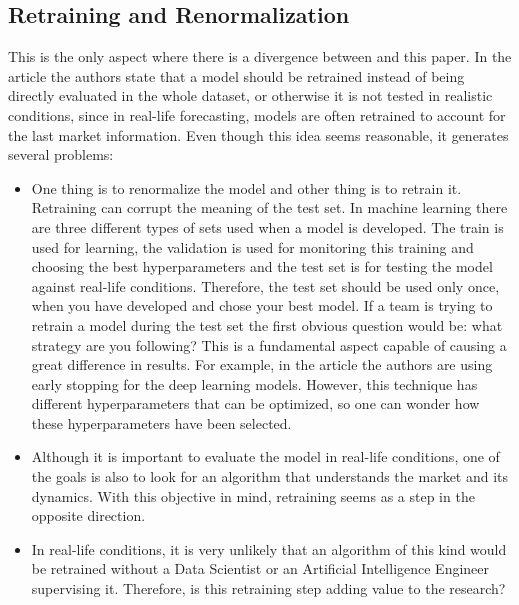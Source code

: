 \documentclass[journal]{IEEEtran}
\begin{document}
\subsection{Retraining and Renormalization}

This is the only aspect where there is a divergence between \cite{lagoForecastingDayaheadElectricity2021} and this paper. In the article the authors state that a model should be retrained instead of being directly evaluated in the whole dataset, or otherwise it is not tested in realistic conditions, since in  real-life forecasting, models are often retrained to account for the last market information. Even though this idea seems reasonable, it generates several problems:

\begin{itemize}
    \item One thing is to renormalize the model and other thing is to retrain it. Retraining can corrupt the meaning of the test set. In machine learning there are three different types of sets used when a model is developed. The train is used for learning, the validation is used for monitoring this training and choosing the best hyperparameters and the test set is for testing the model against real-life conditions. Therefore, the test set should be used only once, when you have developed and chose your best model. If a team is trying to retrain a model during the test set the first obvious question would be: what strategy are you following? This is a fundamental aspect capable of causing a great difference in results. For example, in the article the authors are using early stopping for the deep learning models. However, this technique has different hyperparameters that can be optimized, so one can wonder how these hyperparameters have been selected.
    \item Although it is important to evaluate the model in real-life conditions, one of the goals is also to look for an algorithm that understands the market and its dynamics. With this objective in mind, retraining seems as a step in the opposite direction.
    \item In real-life conditions, it is very unlikely that an algorithm of this kind would be retrained without a Data Scientist or an Artificial Intelligence Engineer supervising it. Therefore, is this retraining step adding value to the research?

\end{itemize}
\end{document}
